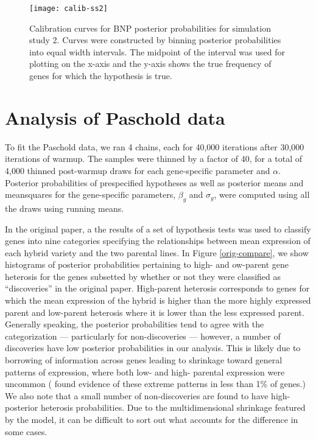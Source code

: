 \begin{itemize}
\begin{figure}[ht!]
\centering
\texttt{[image: calib-ss2]}
\begin{minipage}{.8\textwidth}
\caption{\small Calibration curves for BNP posterior probabilities for simulation study 2. Curves were constructed by binning posterior probabilities into equal width intervals. The midpoint of the interval was used for plotting on the x-axis and the y-axis shows the true frequency of genes for which the hypothesis is true.}
\end{minipage}
\label{calib-ss2}
\end{figure}

\section{Analysis of Paschold data}
\label{analysis}
To fit the Paschold data, we ran 4 chains, each for 40,000 iterations after 30,000 iterations of warmup. The samples were thinned by a factor of 40, for a total of 4,000 thinned post-warmup draws for each gene-specific parameter and $\alpha$. Posterior probabilities of prespecified hypotheses as well as posterior means and meansquares for the gene-specific parameters, $\beta_g$ and $\sigma_g$, were computed using all the draws using running means.

In the original paper, a the results of a set of hypothesis tests was used to classify genes into nine categories specifying the relationships between mean expression of each hybrid variety and the two parental lines. In Figure \ref{orig-compare}, we show histograms of posterior probabilities pertaining to high- and ow-parent gene heterosis for the genes subsetted by whether or not they were classified as ``discoveries'' in the original paper. High-parent heterosis corresponds to genes for which the mean expression of the hybrid is higher than the more highly expressed parent and low-parent heterosis where it is lower than the less expressed parent. Generally speaking, the posterior probabilities tend to agree with the categorization --- particularly for non-discoveries --- however, a number of discoveries have low posterior probabilities in our analysis. This is likely due to borrowing of information across genes leading to shrinkage toward general patterns of expression, where both low- and high- parental expression were uncommon (\citet{paschold} found evidence of these extreme patterns in less than 1\% of genes.) We also note that a small number of non-discoveries are found to have high-posterior heterosis probabilities. Due to the multidimensional shrinkage featured by the model, it can be difficult to sort out what accounts for the difference in some cases.


\end{itemize}

